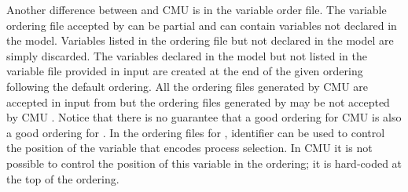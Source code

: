 Another difference between \nusmv and CMU \smv is in the variable
order file.  The variable ordering file accepted by \nusmv can be
partial and can contain variables not declared in the model. Variables
listed in the ordering file but not declared in the model are simply
discarded. The variables declared in the model but not listed in the
variable file provided in input are created at the end of the given
ordering following the default ordering. All the ordering files
generated by CMU \smv are accepted in input from \nusmv but the
ordering files generated by \nusmv may be not accepted by CMU \smv.
Notice that there is no guarantee that a good ordering for CMU \smv is
also a good ordering for \nusmv.  In the ordering files for \nusmv,
identifier  can be used to control the
position of the variable that encodes process selection. In CMU \smv
it is not possible to control the position of this variable in the
ordering; it is hard-coded at the top of the ordering.
